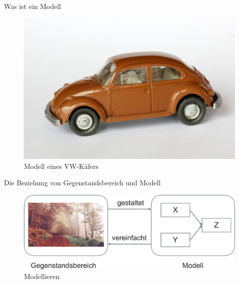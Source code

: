 \begin{frame}{Was ist ein Modell}

\begin{figure}

{\centering \includegraphics[width=0.8\linewidth]{../images/modellieren/vw_modell} 

}

\caption{Modell eines VW-Käfers}\label{fig:vwmodell}
\end{figure}

\end{frame}

\begin{frame}{Die Beziehung von Gegenstandsbereich und Modell}

\begin{figure}

{\centering \includegraphics[width=0.8\linewidth]{../images/modellieren/Modell} 

}

\caption{Modellieren}\label{fig:modellieren-plot}
\end{figure}

\end{frame}

